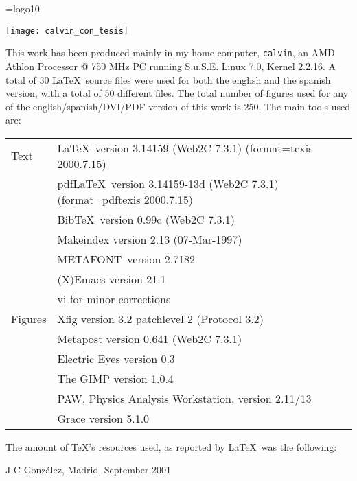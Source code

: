
\thispagestyle{empty}
%
\mbox{}
%
\newpage
%
\thispagestyle{empty}
%
\mbox{}
%
\vfill
%
\scriptsize

\font\logo=logo10
\def\MF{\strut\hbox{\logo METAFONT}}\def\.#1{\strut\hbox{\tt #1}}

\begin{center}
  \texttt{[image: calvin\_con\_tesis]}
\end{center}

\vskip 2cm 

\noindent
This work has been produced mainly in my home computer,
\texttt{calvin}, an AMD Athlon Processor @ 750 MHz PC running S.u.S.E.
Linux 7.0, Kernel 2.2.16. A total of 30 \LaTeX\ source files were used
for both the english and the spanish version, with a total of 50
different files.  The total number of figures used for any of the
english/spanish/DVI/PDF version of this
work is 250. The main tools used are:\\

\begin{tabular}{ll}

Text
 & \LaTeX\ version 3.14159 (Web2C 7.3.1) (format=texis 2000.7.15)\\
 & pdf\LaTeX\ version 3.14159-13d (Web2C 7.3.1) (format=pdftexis 2000.7.15)\\
 & Bib\TeX\ version 0.99c (Web2C 7.3.1)\\
 & Makeindex version 2.13 (07-Mar-1997)\\
 & \MF\ version 2.7182 \\
 & (X)Emacs version 21.1\\
 & vi for minor corrections\vspace{4pt}\\

Figures
 & Xfig  version 3.2 patchlevel 2 (Protocol 3.2)\\
 & Metapost version 0.641 (Web2C 7.3.1)\\
 & Electric Eyes version 0.3\\
 & The GIMP version 1.0.4\\
 & PAW, Physics Analysis Workstation, version 2.11/13 \\
 & Grace version 5.1.0\\

\end{tabular}

\vskip 20pt

\noindent
The amount of \TeX's resources used, as reported by \LaTeX\, was the
following:



\vskip 20pt

\raggedleft J C Gonz\'alez, Madrid, September 2001

\endinput
%

